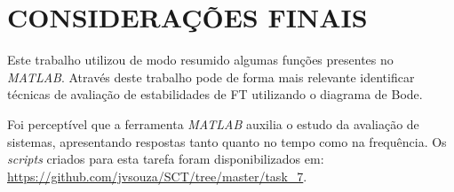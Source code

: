 \section{CONSIDERAÇÕES FINAIS}

Este trabalho utilizou de modo resumido algumas funções presentes no \textit{MATLAB}. Através deste trabalho pode de forma mais relevante identificar técnicas de avaliação de estabilidades de FT utilizando o diagrama de Bode.

Foi perceptível que a ferramenta \textit{MATLAB} auxilia o estudo da avaliação de sistemas, apresentando respostas tanto quanto no tempo como na 
frequência. Os \textit{scripts} criados para esta tarefa foram disponibilizados em: \href{https://github.com/jvsouza/SCT/tree/master/task\_7}{https://github.com/jvsouza/SCT/tree/master/task\_7}.

